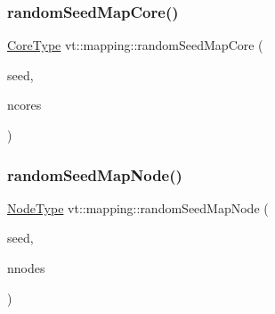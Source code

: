 \subsubsection{\texorpdfstring{random\+Seed\+Map\+Core()}{randomSeedMapCore()}}
{\footnotesize\ttfamily \hyperlink{namespacevt_a74b11b22c02feaabab8591acc87c7c52}{Core\+Type} vt\+::mapping\+::random\+Seed\+Map\+Core (\begin{DoxyParamCaption}\item[{\hyperlink{namespacevt_ae2e13198bdef4d5b8e603d6c1c7f0969}{Seed\+Type}}]{seed,  }\item[{\hyperlink{namespacevt_a74b11b22c02feaabab8591acc87c7c52}{Core\+Type}}]{ncores }\end{DoxyParamCaption})}

\mbox{\label{namespacevt_1_1mapping_accca64daff113b58cd733710ab4e0854}} 
\subsubsection{\texorpdfstring{random\+Seed\+Map\+Node()}{randomSeedMapNode()}}
{\footnotesize\ttfamily \hyperlink{namespacevt_a866da9d0efc19c0a1ce79e9e492f47e2}{Node\+Type} vt\+::mapping\+::random\+Seed\+Map\+Node (\begin{DoxyParamCaption}\item[{\hyperlink{namespacevt_ae2e13198bdef4d5b8e603d6c1c7f0969}{Seed\+Type}}]{seed,  }\item[{\hyperlink{namespacevt_a866da9d0efc19c0a1ce79e9e492f47e2}{Node\+Type}}]{nnodes }\end{DoxyParamCaption})}

